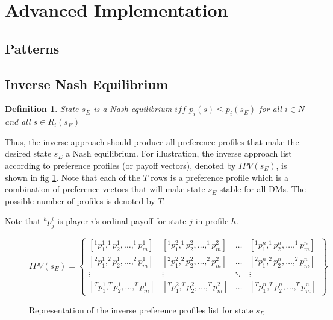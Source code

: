 \documentclass[letterpaper,12pt,titlepage,oneside,final]{book}
\newtheorem{theorem}[lemma]{Theorem}
\newtheorem{definition}[lemma]{Definition}
\begin{document}
\section{Advanced Implementation}

\subsection{Patterns}


\subsection{Inverse Nash Equilibrium}
\begin{definition}
\rm
\label{def:nash_inv1}
State $s_E$ is a Nash equilibrium $iff$ $p_i(s)\leq p_i(s_E)$ for all $i \in N$ and all $s \in R_i(s_E)$


\end{definition}



Thus, the inverse approach should produce all preference profiles that make the desired state $s_E$ a Nash equilibrium. For illustration, the inverse approach list according to preference profiles (or payoff vectors), denoted by $IPV(s_E)$, is shown in fig \ref{fig:IPVil}. Note that each of the $T$ rows is a preference profile which is a combination of preference vectors that will make state $s_E$ stable for all DMs. The possible number of profiles is denoted by $T$. %

\noindent Note that $^hp_j^i$ is player $i$'s ordinal payoff for state $j$ in profile $h$.

\begin{center}
\begin{figure}[H]
\centering


$IPV(s_E)= \begin{Bmatrix}
[^1p_1^1,^1p_2^1, \dots ,^1p_m^1 ] & [^1p_1^2,^1p_2^2, \dots ,^1p_m^2 ] & \dots & [^1p_1^n,^1p_2^n, \dots ,^1p_m^n ] \\ 
[^2p_1^1,^2p_2^1, \dots ,^2p_m^1 ] & [^2p_1^2,^2p_2^2, \dots ,^2p_m^2 ] & \dots & [^2p_1^n,^2p_2^n, \dots ,^2p_m^n ] \\ 
\vdots  & \vdots  & \ddots  & \vdots \\ 
[^Tp_1^1,^Tp_2^1, \dots ,^Tp_m^1 ] & [^Tp_1^2,^Tp_2^2, \dots ,^Tp_m^2 ] & \dots & [^Tp_1^n,^Tp_2^n, \dots ,^Tp_m^n ]
\end{Bmatrix} $



\caption{Representation of the inverse preference profiles list for state $s_E$}

\label{fig:IPVil}
\end{figure}
\end{center}
\end{document}

